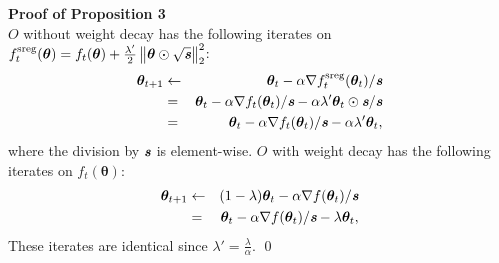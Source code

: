 \documentclass[usenames,dvipsnames]{article} %
\newcommand{\norm}[1]{\left\lVert#1\right\rVert}
\newtheorem{prop}{Proposition}
\newcommand{\vc}[1]{\textit{\textbf{#1}}}
\begin{document}

\noindent{}\textbf{Proof of Proposition 3}\\
$O$ without weight decay has the following iterates on $f_{t}^{\text{sreg}}(\bm{\theta}) = f_t(\bm{\theta}) + \frac{\lambda'}{2} \norm{\bm{\theta} \odot{} \sqrt{\vc{s}}}_2^2$: 
\begin{eqnarray}
\label{eq:sgdl2}
\bm{\theta}_{t+1} & \leftarrow &\bm{\theta}_t - \alpha \nabla f_{t}^{\text{sreg}}(\bm{\theta}_t)/\vc{s}\\
&=& \bm{\theta}_t - \alpha \nabla f_t(\bm{\theta}_t)/\vc{s} - \alpha  \lambda' \bm{\theta}_t \odot \vc{s} / \vc{s}\\
&=& \bm{\theta}_t - \alpha \nabla f_t(\bm{\theta}_t)/\vc{s} - \alpha  \lambda' \bm{\theta}_t,
\end{eqnarray}
where the division by $\vc{s}$ is element-wise.
$O$ with weight decay has the following iterates on $f_t(\bm{\theta})$: 
\begin{eqnarray}
\bm{\theta}_{t+1} &\leftarrow& (1 - \lambda) \bm{\theta}_t - \alpha \nabla f(\bm{\theta}_t) / \vc{s}\\
&=& \bm{\theta}_t - \alpha \nabla f(\bm{\theta}_t) / \vc{s} -\lambda \bm{\theta}_t ,
\end{eqnarray}
These iterates are identical since $\lambda' = \frac{\lambda}{\alpha}$. \qed


\end{document}
